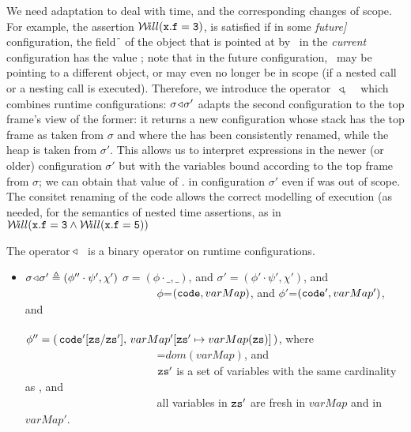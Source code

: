 We need adaptation to deal with time, and the corresponding changes of scope. For example, the assertion 
${{\mathcal W}\!ill}({\mbox{\tt{x}}}.{\mbox{\tt{f}}}={\mbox{\tt{3}}})$, is satisfied if in some {\em future]} configuration, the field  \f\, of the object that is pointed at by \x\, in the {\em current} configuration has the value ; note that in the future  configuration, \x\, may be pointing to a different object, or may
even no longer be in scope (\eg if a nested call or a nesting call is executed). 
Therefore, we introduce the operator \  $\!\triangleleft\!$,  \ \ which combines runtime configurations: $\sigma \!\triangleleft\! \sigma'$ adapts the second configuration to the top frame's view of the former: it returns a new configuration whose stack has  the top frame as taken from $\sigma$ and where the  has been consistently renamed, while the heap is taken from $\sigma'$. This allows us to interpret expressions  in the newer (or older) configuration $\sigma'$ but with the variables bound according to the top frame from $\sigma$; \eg we can obtain that value of . in configuration  $\sigma'$ even if  was out of scope. The consitet renaming of the code allows the correct modelling of execution (as needed,   for the semantics of  nested time assertions, as \eg in ${{\mathcal W}\!ill}({\mbox{\tt{x}}}.{\mbox{\tt{f}}}={\mbox{\tt{3}}} \wedge {{\mathcal W}\!ill}({\mbox{\tt{x}}}.{\mbox{\tt{f}}}={\mbox{\tt{5}}}))$
   

 \begin{definition}  The operator $\!\triangleleft\!$\ \  is a binary operator on runtime configurations.
 \label{def:config:adapt}
 $~ $ 
 
\begin{itemize}
\item
$\sigma \!\triangleleft\! \sigma' \triangleq (\phi''\cdot\psi',\chi')$  \IFF $\sigma=(\phi\cdot\_,\_)$, and $\sigma'= (\phi'\cdot\psi',\chi')$, and
 \\
$\ \strut \ \ \hspace{1.45in} $  
$\phi$=$({\mbox{\tt{code}}},varMap)$, and $\phi'$=$({\mbox{\tt{code}}}',varMap')$, and
 \\
$\ \strut \ \ \hspace{1.45in} $     %
  $\phi''=(\, {\mbox{\tt{code}}}'[{\mbox{\tt{zs}}}/{\mbox{\tt{zs}}}' ],\,varMap'[{\mbox{\tt{zs}}}'\mapsto varMap({\mbox{\tt{zs}}})]\, ) $, where
 \\
$\ \strut \ \ \hspace{1.45in} $  
=$dom(varMap)$, and
 \\
$\ \strut \ \ \hspace{1.45in} $      ${\mbox{\tt{zs}}}'$ is a set  of variables with  the  same cardinality as , and
 \\
$\ \strut \ \ \hspace{1.45in} $   all variables in
${\mbox{\tt{zs}}}'$  are fresh in $varMap$ and in $varMap'$.


\end{itemize}

\end{definition}

